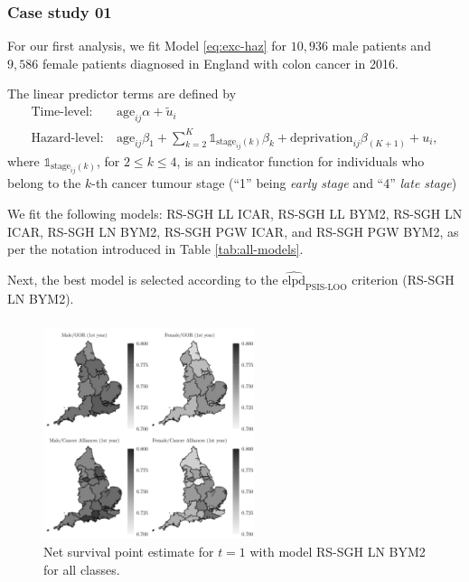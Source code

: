 \documentclass[10pt, aspectratio = 169, handout]{beamer} %
\begin{document}
    \begin{frame}[t]
		\frametitle{Case study 01}
		\justifying

            For our first analysis, we fit \textcolor{titles}{Model \eqref{eq:exc-haz}} for $10,936$ male patients and $9,586$ female patients diagnosed in England with colon cancer in 2016. 

            \pause
            
            The linear predictor terms are defined by
            \begin{align*}
                \text{Time-level}: ~&\text{age}_{ij} \alpha + \tilde{u}_{i} \\
                \text{Hazard-level}: ~&\text{age}_{ij}\beta_1 + \sum_{k = 2}^K \mathds{1}_{\text{stage}_{ij}(k)} \beta_k + \text{deprivation}_{ij} \beta_{(K + 1)} + u_i,
            \end{align*}
            where $\mathds{1}_{\text{stage}_{ij}(k)}$, for $2 \leq k \leq 4$, is an indicator function for individuals who belong to the $k$-th cancer tumour stage (``1'' being \textit{early stage} and ``4'' \textit{late stage})

            \pause
            
            We fit the following models: RS-SGH LL ICAR, RS-SGH LL BYM2, RS-SGH LN ICAR, RS-SGH LN BYM2, RS-SGH PGW ICAR, and RS-SGH PGW BYM2, as per the notation introduced in \textcolor{titles}{Table \ref{tab:all-models}}. 

            \pause
            
            Next, \hspace{-1pt}the best model is selected according to the $\widehat{\text{elpd}}_{\text{PSIS-LOO}}$ \hspace{-1pt}criterion (RS-SGH LN BYM2). 

	\end{frame}

    \begin{frame}[t]
		\frametitle{}
		\justifying

        \vspace{-6pt}
        \begin{figure}[!ht]
            \centering
            \includegraphics[width = 0.55\textwidth]{Images/cs01-t1-mean.jpg}
            \caption{Net survival point estimate for $t = 1$ with model RS-SGH LN BYM2 for all classes.}
            \label{fig:cs01-t1-mean}
        \end{figure}

    \end{frame}
\end{document}
